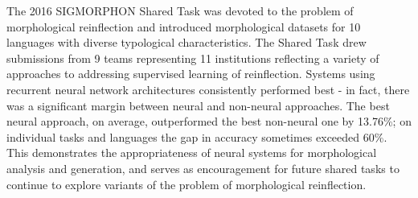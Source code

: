 The 2016 SIGMORPHON Shared Task was devoted to the problem of morphological reinflection and introduced morphological datasets for 10 languages with diverse typological characteristics. The Shared Task drew submissions from 9 teams representing 11 institutions reflecting a variety of approaches to addressing supervised learning of reinflection.  Systems using recurrent neural network architectures consistently performed best - in fact, there was a significant margin between neural and non-neural approaches.  The best neural approach, on average, outperformed the best non-neural one by 13.76\%; on individual tasks and languages the gap in accuracy sometimes exceeded 60\%. This demonstrates the appropriateness of neural systems for morphological analysis and generation, and serves as encouragement for future shared tasks to continue to explore variants of the problem of morphological reinflection.
